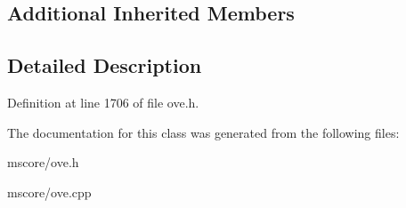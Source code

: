 \subsection*{Additional Inherited Members}


\subsection{Detailed Description}


Definition at line 1706 of file ove.\+h.



The documentation for this class was generated from the following files\+:\begin{DoxyCompactItemize}
\item 
mscore/ove.\+h\item 
mscore/ove.\+cpp\end{DoxyCompactItemize}
